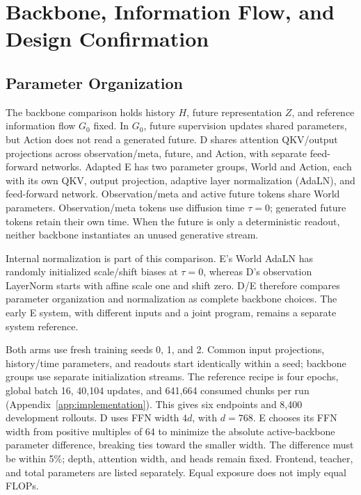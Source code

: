 \section{Backbone, Information Flow, and Design Confirmation}
\label{app:q3}

\subsection{Parameter Organization}
The backbone comparison holds history $H$, future representation $Z$, and
reference information flow $G_0$ fixed. In $G_0$, future supervision updates
shared parameters, but Action does not read a generated future. D shares
attention QKV/output projections across observation/meta, future, and Action,
with separate feed-forward networks. Adapted E has two parameter groups,
World and Action, each with its own QKV, output projection, adaptive layer
normalization (AdaLN), and feed-forward network. Observation/meta and active
future tokens share World parameters. Observation/meta tokens use diffusion
time $\tau=0$; generated future tokens retain their own time. When the future
is only a deterministic readout, neither backbone instantiates an unused
generative stream.

Internal normalization is part of this comparison. E's World AdaLN has
randomly initialized scale/shift biases at $\tau=0$, whereas D's observation
LayerNorm starts with affine scale one and shift zero. D/E therefore compares
parameter organization and normalization as complete backbone choices.
The early E system, with different inputs and a joint program, remains a
separate system reference.

Both arms use fresh training seeds 0, 1, and 2. Common input projections,
history/time parameters, and readouts start identically within a seed;
backbone groups use separate initialization streams. The reference recipe
is four epochs, global batch 16, 40,104 updates, and 641,664 consumed chunks
per run (Appendix~\ref{app:implementation}). This gives six endpoints and
8,400 development rollouts. D uses FFN width $4d$, with $d=768$.
E chooses its FFN width from positive multiples of 64 to minimize the
absolute active-backbone parameter difference, breaking ties toward the
smaller width. The difference must be within 5\%; depth, attention width,
and heads remain fixed. Frontend, teacher, and total parameters are listed separately.
Equal exposure does not imply equal FLOPs.

